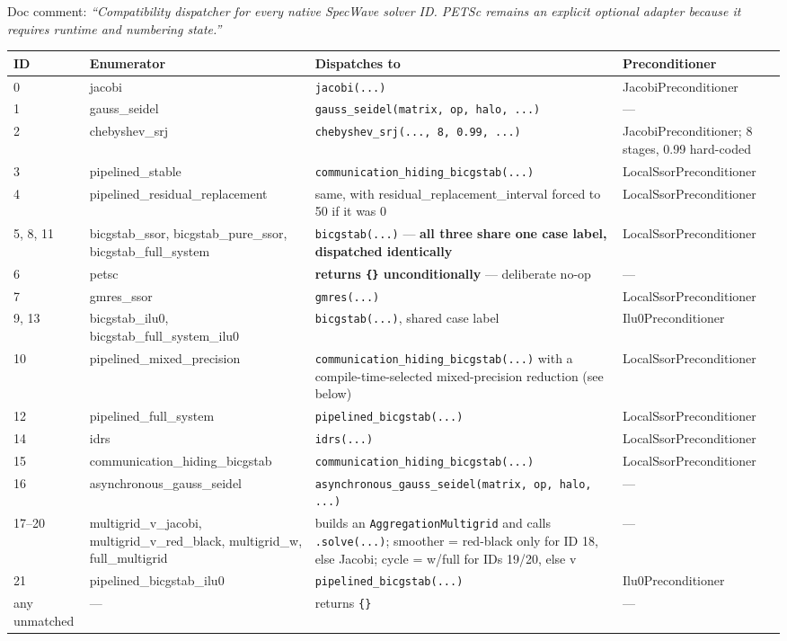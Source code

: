 \documentclass[11pt,a4paper]{report}
\begin{document}
Doc comment: \emph{``Compatibility dispatcher for every native SpecWave
solver ID. PETSc remains an explicit optional adapter because it
requires runtime and numbering state.''}

\begin{longtable}{C{0.08\textwidth}L{0.24\textwidth}P{0.32\textwidth}L{0.20\textwidth}}
\toprule
ID & Enumerator & Dispatches to & Preconditioner \\
\midrule
{} & jacobi & \lstinline!jacobi(...)! & JacobiPreconditioner \\
1 & gauss\_seidel & \lstinline!gauss_seidel(matrix, op, halo, ...)! & --- \\
2 & chebyshev\_srj & \lstinline!chebyshev_srj(..., 8, 0.99, ...)! & JacobiPreconditioner; 8 stages, 0.99 hard-coded \\
3 & pipelined\_stable & \lstinline!communication_hiding_bicgstab(...)! & LocalSsorPreconditioner \\
4 & pipelined\_residual\_replacement & same, with residual\_replacement\_interval forced to 50 if it was 0 & LocalSsorPreconditioner \\
5, 8, 11 & bicgstab\_ssor, bicgstab\_pure\_ssor, bicgstab\_full\_system & \lstinline!bicgstab(...)! --- \textbf{all three share one case label, dispatched identically} & LocalSsorPreconditioner \\
6 & petsc & \textbf{returns \texttt{\{\}} unconditionally} --- deliberate no-op & --- \\
7 & gmres\_ssor & \lstinline!gmres(...)! & LocalSsorPreconditioner \\
9, 13 & bicgstab\_ilu0, bicgstab\_full\_system\_ilu0 & \lstinline!bicgstab(...)!, shared case label & Ilu0Preconditioner \\
10 & pipelined\_mixed\_precision & \lstinline!communication_hiding_bicgstab(...)! with a compile-time-selected mixed-precision reduction (see below) & LocalSsorPreconditioner \\
12 & pipelined\_full\_system & \lstinline!pipelined_bicgstab(...)! & LocalSsorPreconditioner \\
14 & idrs & \lstinline!idrs(...)! & LocalSsorPreconditioner \\
15 & communication\_hiding\_bicgstab & \lstinline!communication_hiding_bicgstab(...)! & LocalSsorPreconditioner \\
16 & asynchronous\_gauss\_seidel & \lstinline!asynchronous_gauss_seidel(matrix, op, halo, ...)! & --- \\
17--20 & multigrid\_v\_jacobi, multigrid\_v\_red\_black, multigrid\_w, full\_multigrid & builds an \lstinline!AggregationMultigrid! and calls \lstinline!.solve(...)!; smoother = red-black only for ID 18, else Jacobi; cycle = w/full for IDs 19/20, else v & --- \\
21 & pipelined\_bicgstab\_ilu0 & \lstinline!pipelined_bicgstab(...)! & Ilu0Preconditioner \\
any unmatched & --- & returns \texttt{\{\}} & --- \\
\bottomrule
\end{longtable}
\end{document}
